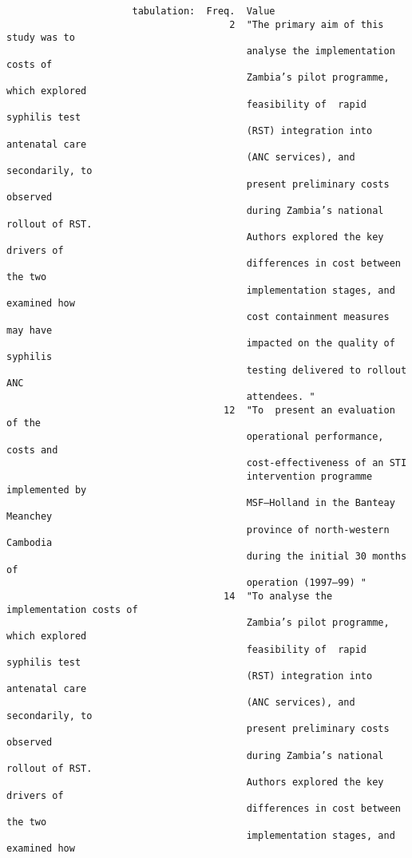 \documentclass{article}
\begin{document}
\begin{verbatim}
                      tabulation:  Freq.  Value
                                       2  "The primary aim of this study was to
                                          analyse the implementation costs of
                                          Zambia’s pilot programme, which explored
                                          feasibility of  rapid syphilis test
                                          (RST) integration into antenatal care
                                          (ANC services), and secondarily, to
                                          present preliminary costs observed
                                          during Zambia’s national rollout of RST.
                                          Authors explored the key drivers of
                                          differences in cost between the two
                                          implementation stages, and examined how
                                          cost containment measures may have
                                          impacted on the quality of syphilis
                                          testing delivered to rollout ANC
                                          attendees. "
                                      12  "To  present an evaluation of the
                                          operational performance, costs and
                                          cost-effectiveness of an STI
                                          intervention programme implemented by
                                          MSF–Holland in the Banteay Meanchey
                                          province of north-western Cambodia
                                          during the initial 30 months of
                                          operation (1997–99) "
                                      14  "To analyse the implementation costs of
                                          Zambia’s pilot programme, which explored
                                          feasibility of  rapid syphilis test
                                          (RST) integration into antenatal care
                                          (ANC services), and secondarily, to
                                          present preliminary costs observed
                                          during Zambia’s national rollout of RST.
                                          Authors explored the key drivers of
                                          differences in cost between the two
                                          implementation stages, and examined how

\end{verbatim}
\end{document}
